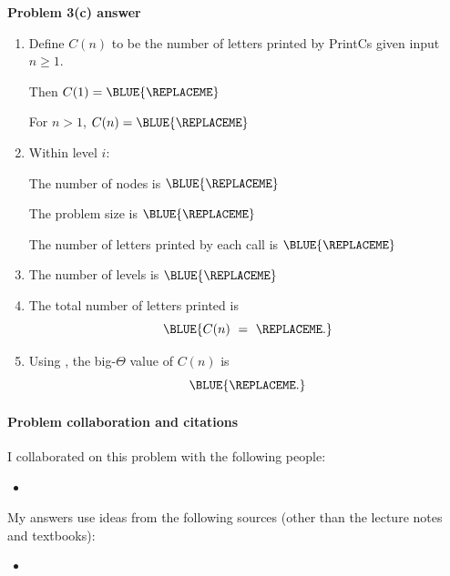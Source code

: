\textbf{Problem 3(c) answer}

\begin{enumerate}
  
\item[(i)] Define $C(n)$ to be the number of letters printed by {\sc PrintCs} given input $n\ge 1$.

  Then $C(1) = \BLUE{
    \REPLACEME 
  }$

  For $n>1$, $C(n) = \BLUE{
    \REPLACEME 
  }$
  
\item[(ii)] Within level $i$:

  The number of nodes is $\BLUE{
    \REPLACEME 
  }$
  
  The problem size is $\BLUE{
    \REPLACEME 
  }$

  The number of letters printed by each call is $\BLUE{
    \REPLACEME 
  }$

\item[(iii)] The number of levels is $\BLUE{
    \REPLACEME 
  }$
  
\item[(iv)] The total number of letters printed is 
  \[\BLUE{ C(n) ~=~ 
      \REPLACEME
    .}
  \]

\item[(v)] Using
  \BLUE{
    \REPLACEME
  },
  the big-$\Theta$ value of $C(n)$ is
  \[\BLUE{
      \REPLACEME
    .}\]

\end{enumerate}

\vfill

\paragraph{Problem  collaboration and citations}

I collaborated on this problem with the following people:
\begin{blue}
  \begin{itemize}
  \item \REPLACEME                    %
  \end{itemize}
\end{blue}

My answers use ideas from the following sources (other than the lecture notes and textbooks): 
\begin{blue}
  \begin{itemize}
  \item \REPLACEME                    %
  \end{itemize}
\end{blue}


